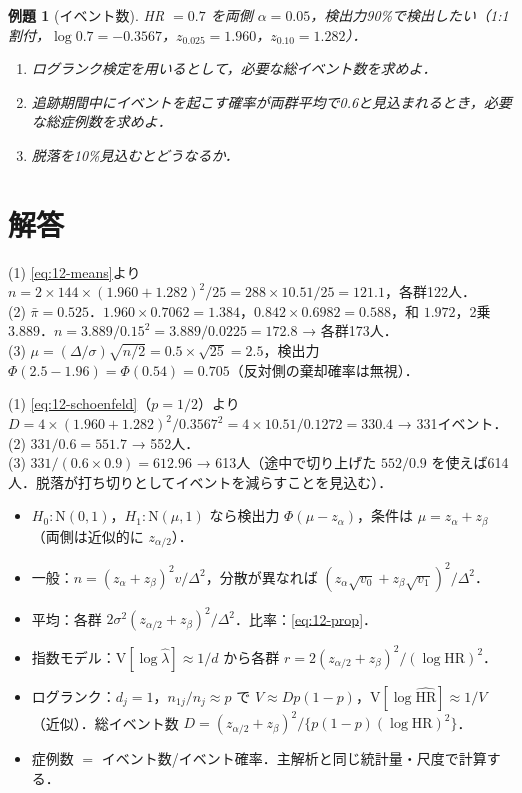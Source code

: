 \documentclass[a4paper,11pt,openany]{ltjsbook}
\newtheorem{reidai}{例題}[chapter]
\newenvironment{kaitou}[1]{%
  \par\medskip\noindent
  \begin{tcolorbox}[enhanced,breakable,colback=bkgray!3,colframe=bkgray!60,boxrule=0.4pt,
    left=4pt,right=4pt,top=2pt,bottom=2pt,arc=1pt,
    title={\cref{#1}の解答},fonttitle=\bfseries\small,coltitle=white,colbacktitle=bkgray!80]}%
  {\end{tcolorbox}\par}
\newcommand{\V}{\mathrm{V}}
\newcommand{\HR}{\mathrm{HR}}
\newcommand{\Normal}{\mathrm{N}}
\begin{document}
\begin{reidai}[イベント数]\label{reidai:12-2}
HR $=0.7$ を両側 $\alpha=0.05$，検出力90\%で検出したい（1:1割付，$\log0.7=-0.3567$，$z_{0.025}=1.960$，$z_{0.10}=1.282$）．
\begin{enumerate}[label=(\arabic*)]
\item ログランク検定を用いるとして，必要な総イベント数を求めよ．
\item 追跡期間中にイベントを起こす確率が両群平均で0.6と見込まれるとき，必要な総症例数を求めよ．
\item 脱落を10\%見込むとどうなるか．
\end{enumerate}
\end{reidai}

\section{解答}\label{sec:12-sol}
\begin{kaitou}{reidai:12-1}
(1) \cref{eq:12-means}より $n=2\times144\times(1.960+1.282)^2/25=288\times10.51/25=121.1$，各群122人．\\
(2) $\bar\pi=0.525$．$1.960\times0.7062=1.384$，$0.842\times0.6982=0.588$，和 $1.972$，2乗 $3.889$．$n=3.889/0.15^2=3.889/0.0225=172.8$ → 各群173人．\\
(3) $\mu=(\Delta/\sigma)\sqrt{n/2}=0.5\times\sqrt{25}=2.5$，検出力 $\Phi(2.5-1.96)=\Phi(0.54)=0.705$（反対側の棄却確率は無視）．
\end{kaitou}

\begin{kaitou}{reidai:12-2}
(1) \cref{eq:12-schoenfeld}（$p=1/2$）より $D=4\times(1.960+1.282)^2/0.3567^2=4\times10.51/0.1272=330.4$ → 331イベント．\\
(2) $331/0.6=551.7$ → 552人．\\
(3) $331/(0.6\times0.9)=612.96$ → 613人（途中で切り上げた $552/0.9$ を使えば614人．脱落が打ち切りとしてイベントを減らすことを見込む）．
\end{kaitou}

\begin{summarybox}
\begin{itemize}
\item $H_0:\Normal(0,1)$，$H_1:\Normal(\mu,1)$ なら検出力 $\Phi(\mu-z_\alpha)$，条件は $\mu=z_\alpha+z_\beta$（両側は近似的に $z_{\alpha/2}$）．
\item 一般：$n=(z_\alpha+z_\beta)^2v/\Delta^2$，分散が異なれば $(z_\alpha\sqrt{v_0}+z_\beta\sqrt{v_1})^2/\Delta^2$．
\item 平均：各群 $2\sigma^2(z_{\alpha/2}+z_\beta)^2/\Delta^2$．比率：\cref{eq:12-prop}．
\item 指数モデル：$\V[\log\hat\lambda]\approx1/d$ から各群 $r=2(z_{\alpha/2}+z_\beta)^2/(\log\HR)^2$．
\item ログランク：$d_j=1$，$n_{1j}/n_j\approx p$ で $V\approx Dp(1-p)$，$\V[\log\widehat{\HR}]\approx1/V$（近似）．総イベント数 $D=(z_{\alpha/2}+z_\beta)^2/\{p(1-p)(\log\HR)^2\}$．
\item 症例数 $=$ イベント数/イベント確率．主解析と同じ統計量・尺度で計算する．
\end{itemize}
\end{summarybox}
\end{document}
